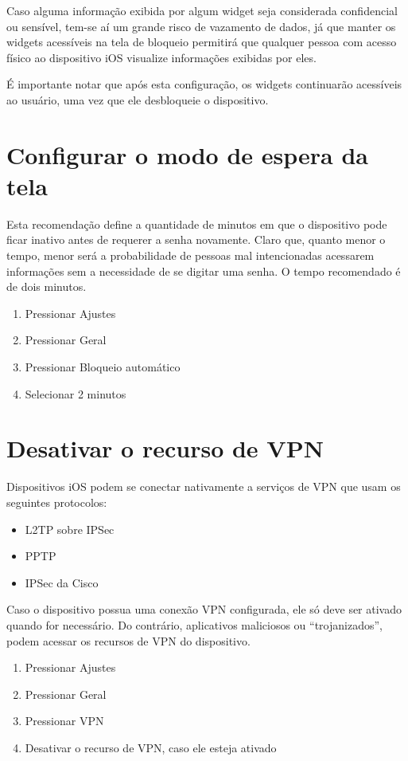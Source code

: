 Caso alguma informa\c c\~ao exibida por algum widget seja considerada confidencial ou sens\'ivel, tem-se a\'i um grande risco de vazamento de dados, j\'a que manter os widgets acess\'iveis na tela de bloqueio permitir\'a que qualquer pessoa com acesso f\'isico ao dispositivo iOS visualize informa\c c\~oes exibidas por eles.

\'E importante notar que ap\'os esta configura\c c\~ao, os widgets continuar\~ao acess\'iveis ao usu\'ario, uma vez que ele desbloqueie o dispositivo.

\section{Configurar o modo de espera da tela}

Esta recomenda\c c\~ao define a quantidade de minutos em que o dispositivo pode ficar inativo antes de requerer a senha novamente. Claro que, quanto menor o tempo, menor ser\'a a probabilidade de pessoas mal intencionadas acessarem informa\c c\~oes sem a necessidade de se digitar uma senha. O tempo recomendado \'e de dois minutos.

\begin{enumerate}
\item Pressionar Ajustes
\item Pressionar Geral
\item Pressionar Bloqueio autom\'atico
\item Selecionar 2 minutos
\end{enumerate}

\section{Desativar o recurso de VPN} 

Dispositivos iOS podem se conectar nativamente a servi\c cos de VPN que usam os seguintes protocolos:

\begin{itemize}
\item L2TP sobre IPSec
\item PPTP
\item IPSec da Cisco
\end{itemize}

Caso o dispositivo possua uma conex\~ao VPN configurada, ele s\'o deve ser ativado quando for necess\'ario. Do contr\'ario, aplicativos maliciosos ou ``trojanizados'', podem acessar os recursos de VPN do dispositivo.

\begin{enumerate}
\item Pressionar Ajustes
\item Pressionar Geral
\item Pressionar VPN
\item Desativar o recurso de VPN, caso ele esteja ativado
\end{enumerate}

